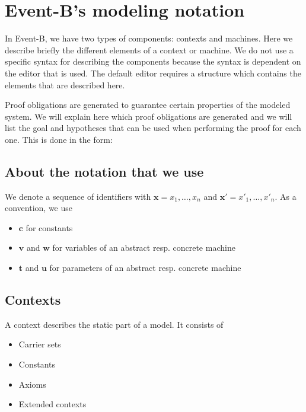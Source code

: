\newcommand{\varlist}[1]{\mathbf{#1}}
\newcommand{\allconstants}{\varlist{c}}
\newcommand{\absvariables}{\varlist{v}}
\newcommand{\concvariables}{\varlist{w}}
\newcommand{\allvariables}{{\absvariables,\concvariables}}
\newcommand{\absparameters}{\varlist{t}}
\newcommand{\concparameters}{\varlist{u}}
\newcommand{\allparameters}{{\absparameters,\concparameters}}
\newcommand{\absbeforeafter}{\mathcal{S}}
\newcommand{\concbeforeafter}{\mathcal{T}}

\section{Event-B's modeling notation}
\label{modeling_notation}

In Event-B, we have two types of components: contexts and machines.
Here we describe briefly the different elements of a context or machine.
We do not use a specific syntax for describing the components because the syntax is dependent on the editor that is
used. The default editor requires a structure which contains the elements that are described here.

Proof obligations are generated to guarantee certain properties of the modeled system.
We will explain here which proof obligations are generated and we will list the goal and hypotheses that can be used
when performing the proof for each one.
This is done in the form:

\subsection{About the notation that we use}
We denote a sequence of identifiers with $\varlist{x} = x_1,\ldots,x_n$ and $\varlist{x}' = x'_1,\ldots,x'_n$.
As a convention, we use
\begin{itemize}
\item $\allconstants$ for constants
\item $\absvariables$ and $\concvariables$ for variables of an abstract resp. concrete machine
\item $\absparameters$ and $\concparameters$ for parameters of an abstract resp. concrete machine
\end{itemize}

\subsection{Contexts}
A context describes the static part of a model. It consists of
\begin{itemize}
\item Carrier sets
\item Constants
\item Axioms
\item Extended contexts
\end{itemize}

